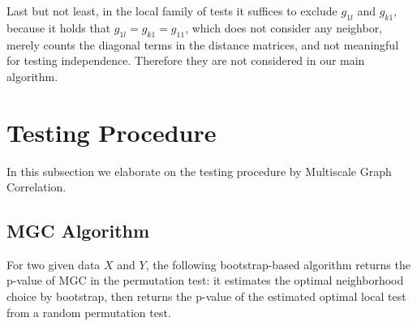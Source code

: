 \documentclass[11pt]{article}
\begin{document}
Last but not least, in the local family of tests it suffices to exclude $g_{1l}$ and $g_{k1}$, because it holds that $g_{1l}=g_{k1}=g_{11}$, which does not consider any neighbor, merely counts the diagonal terms in the distance matrices, and not meaningful for testing independence. Therefore they are not considered in our main algorithm.

\section{Testing Procedure}
\label{main3}

In this subsection we elaborate on the testing procedure by Multiscale Graph Correlation.

\subsection{MGC Algorithm}

For two given data $X$ and $Y$, the following bootstrap-based algorithm returns the p-value of MGC in the permutation test: it estimates the optimal neighborhood choice by bootstrap, then returns the p-value of the estimated optimal local test from a random permutation test.
\end{document}
